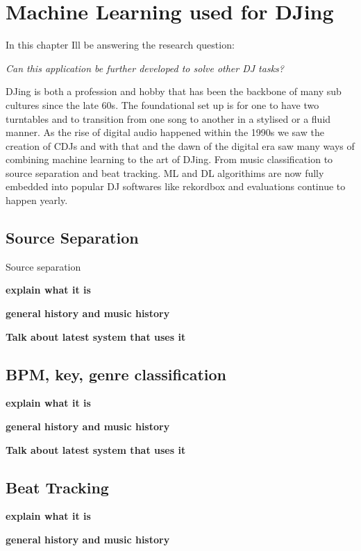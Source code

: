 
\graphicspath{{Chapter3/}}

\chapter{Machine Learning used for DJing}

In this chapter Ill be answering the research question:

\textit{Can this application be further developed to solve other DJ tasks?} 

DJing is both a profession and hobby that has been the backbone of many sub cultures since the late 60s. The foundational set up is for one to have two turntables and to transition from one song to another in a stylised or a fluid manner. As the rise of digital audio happened within the 1990s we saw the creation of CDJs and with that and the dawn of the digital era saw many ways of combining machine learning to the art of DJing. From music classification to source separation and beat tracking. ML and DL algorithims are now fully embedded into popular DJ softwares like rekordbox and evaluations continue to happen yearly. 

\section{Source Separation}

Source separation 

\textbf{explain what it is}

\textbf{general history and music history}

\textbf{Talk about latest system that uses it}

\section{BPM, key, genre classification}

\textbf{explain what it is}

\textbf{general history and music history}

\textbf{Talk about latest system that uses it}

\section{Beat Tracking}

\textbf{explain what it is}

\textbf{general history and music history}

